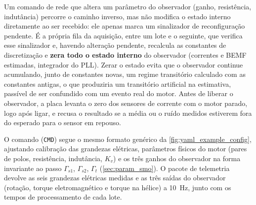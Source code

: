 Um comando de rede que altera um parâmetro do observador (ganho, resistência,
indutância) percorre o caminho inverso, mas não modifica o estado interno
diretamente ao ser recebido: ele apenas marca um sinalizador de
reconfiguração pendente. É a própria fila da aquisição, entre um lote e o
seguinte, que verifica esse sinalizador e, havendo alteração pendente,
recalcula as constantes de discretização e \textbf{zera todo o estado interno}
do observador (correntes e BEMF estimadas, integrador do PLL). Zerar o estado
evita que o observador continue acumulando, junto de constantes novas, um
regime transitório calculado com as constantes antigas, o que produziria um
transitório artificial na estimativa, passível de ser confundido com um evento
real do motor. Antes de liberar o observador, a placa levanta o zero dos
sensores de corrente com o motor parado, logo após ligar, e recusa o resultado
se a média ou o ruído medidos estiverem fora do esperado para o sensor em
repouso.

O comando (\texttt{CMD}) segue o mesmo formato genérico da
\autoref{fig:yaml_example_config}, ajustando calibração das grandezas
elétricas, parâmetros físicos do motor (pares de polos, resistência,
indutância, $K_v$) e os três ganhos do observador na forma invariante ao
passo $\Gamma_{s1}$, $\Gamma_{s2}$, $\Gamma_t$ (\autoref{sec:param_smo}). O
pacote de telemetria devolve as seis grandezas elétricas medidas e as três
saídas do observador (rotação, torque eletromagnético e torque na hélice)
a 10~Hz, junto com os tempos de processamento de cada lote.
